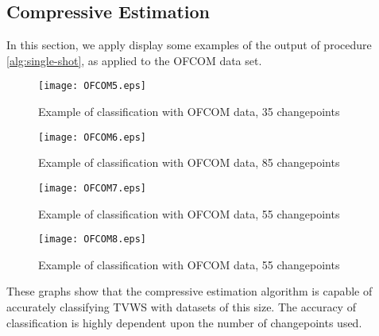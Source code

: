 \clearpage

\subsection{Compressive Estimation}

In this section, we apply display some examples of the output of procedure \ref{alg:single-shot}, as applied to the OFCOM data set. 

\begin{figure}[h]
\centering
\texttt{[image: OFCOM5.eps]}
\caption{Example of classification with OFCOM data, 35 changepoints}
\label{fig:hvb}
\end{figure}

\begin{figure}[h]
\centering
\texttt{[image: OFCOM6.eps]}
\caption{Example of classification with OFCOM data, 85 changepoints}
\label{fig:hvb}
\end{figure}

\begin{figure}[h]
\centering
\texttt{[image: OFCOM7.eps]}
\caption{Example of classification with OFCOM data, 55 changepoints}
\label{fig:hvb}
\end{figure}

\begin{figure}[h]
\centering
\texttt{[image: OFCOM8.eps]}
\caption{Example of classification with OFCOM data, 55 changepoints}
\label{fig:hvb}
\end{figure}

These graphs show that the compressive estimation algorithm is capable of accurately classifying TVWS with datasets of this size. The accuracy of classification is highly dependent upon the number of changepoints used.

